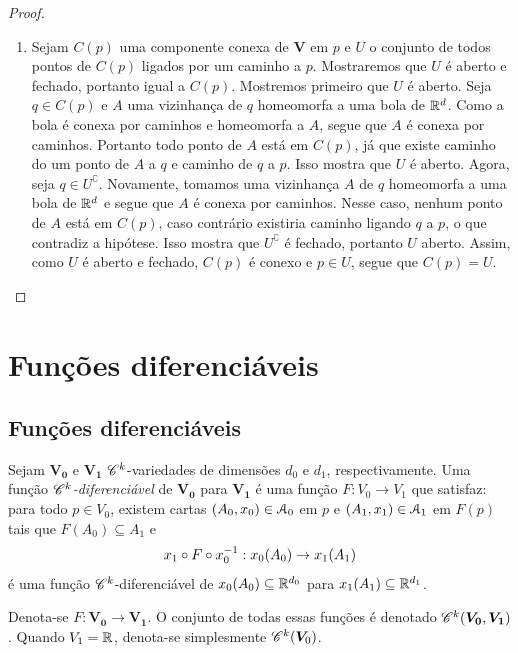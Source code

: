 \begin{proof}
\begin{enumerate}
	\item Sejam $C(p)$ uma componente conexa de $\bm V$ em $p$ e $U$ o conjunto de todos pontos de $C(p)$ ligados por um caminho a $p$. Mostraremos que $U$ é aberto e fechado, portanto igual a $C(p)$. Mostremos primeiro que $U$ é aberto. Seja $q \in C(p)$ e $A$ uma vizinhança de $q$ homeomorfa a uma bola de $\mathbb{R}^d$. Como a bola é conexa por caminhos e homeomorfa a $A$, segue que $A$ é conexa por caminhos. Portanto todo ponto de $A$ está em $C(p)$, já que existe caminho do um ponto de $A$ a $q$ e caminho de $q$ a $p$. Isso mostra que $U$ é aberto. Agora, seja $q \in U^\complement$. Novamente, tomamos uma vizinhança $A$ de $q$ homeomorfa a uma bola de $\mathbb{R}^d$ e segue que $A$ é conexa por caminhos. Nesse caso, nenhum ponto de $A$ está em $C(p)$, caso contrário existiria caminho ligando $q$ a $p$, o que contradiz a hipótese. Isso mostra que $U^\complement$ é fechado, portanto $U$ aberto. Assim, como $U$ é aberto e fechado, $C(p)$ é conexo e $p \in U$, segue que $C(p)=U$.
		\end{enumerate}
\end{proof}

\section{Funções diferenciáveis}

\subsection{Funções diferenciáveis}

\begin{definition}
Sejam $\bm{V_0}$ e $\bm{V_1}$ $\mathscr{C}^k$-variedades de dimensões $d_0$ e $d_1$, respectivamente. Uma função \emph{$\mathscr{C}^k$-diferenciável} de $\bm{V_0}$ para $\bm{V_1}$ é uma função
 $F\colon V_0 \to V_1$ que satisfaz: para todo $p \in V_0$, existem cartas $(A_0,x_0) \in \mathcal{A}_0$ em $p$ e $(A_1,x_1) \in \mathcal{A}_1$ em $F(p)$ tais que $F(A_0) \subseteq A_1$ e
		\begin{equation*}
		x_1 \circ F \circ x_0^{-1}: x_0(A_0) \to x_1(A_1)
		\end{equation*}
é uma função $\mathscr{C}^k$-diferenciável de $x_0(A_0) \subseteq \mathbb{R}^{d_0}$ para $x_1(A_1) \subseteq \mathbb{R}^{d_1}$.

Denota-se $F\colon \bm{V_0} \to \bm{V_1}$. O conjunto de todas essas funções é denotado $\mathscr{C}^k(\bm{V_0},\bm{V_1})$. Quando $V_1=\mathbb{R}$, denota-se simplesmente $\mathscr{C}^k(\bm V_0)$.
\end{definition}

